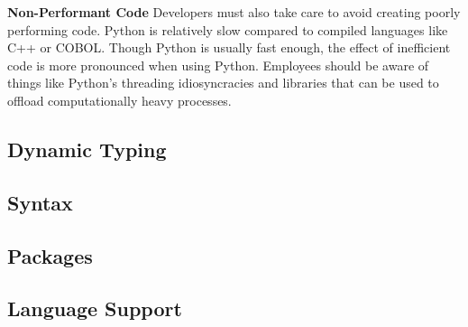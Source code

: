                                                 \textbf{Non-Performant Code}
                                                Developers must also take care to avoid creating poorly performing code. Python is relatively slow compared to compiled languages like C++ or COBOL. Though Python is usually fast enough, the effect of inefficient code is more pronounced when using Python. Employees should be aware of things like Python's threading idiosyncracies and libraries that can be used to offload computationally heavy processes.
 
                \subsection{Dynamic Typing}
 
                \subsection{Syntax}
 
                \subsection{Packages}
 
                \subsection{Language Support}
 
